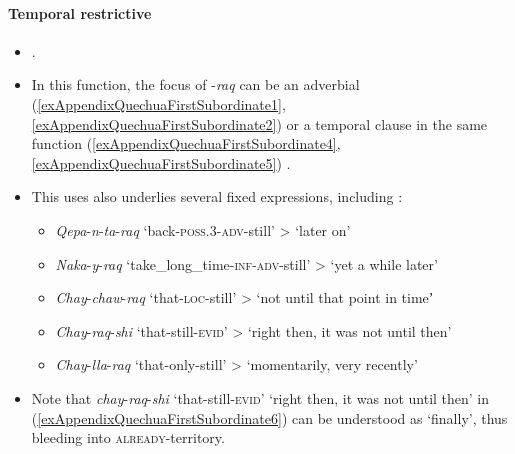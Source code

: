 \paragraph{Temporal restrictive}
\label{AppendixQuechuaFirstSubordinate}
\begin{itemize}
	\item \textcite[386–387]{Weber1989}.
	\item In this function, the focus of \mbox{-\textit{raq}} can be an adverbial (\ref{exAppendixQuechuaFirstSubordinate1}, \ref{exAppendixQuechuaFirstSubordinate2}) or a temporal clause in the same function (\ref{exAppendixQuechuaFirstSubordinate4}, \ref{exAppendixQuechuaFirstSubordinate5}) . 
	\item This uses also underlies several fixed expressions, including \parencite[65–66, 390]{Weber1989}:
	\begin{itemize}

		\item \textit{Qepa}-\textit{n}-\textit{ta}-\textit{raq} \lq back-\textsc{poss}.3-\textsc{adv}-still' > \lq later on'
		\item \textit{Naka}-\textit{y}-\textit{raq} \lq take\_long\_time-\textsc{inf}-\textsc{adv}-still' > \lq yet a while later'
		\item \textit{Chay}-\textit{chaw}-\textit{raq} \lq that-\textsc{loc}-still' > \lq not until that point in timeʼ
		\item \textit{Chay}-\textit{raq}-\textit{shi} \lq that-still-\textsc{evid}' > \lq right then, it was not until then'
		\item \textit{Chay}-\textit{lla}-\textit{raq} \lq that-only-still' > \lq momentarily, very recently'
	\end{itemize}
	\item Note that \textit{chay}-\textit{raq}-\textit{shi} \lq that-still-\textsc{evid}'  \lq right then, it was not until then' in (\ref{exAppendixQuechuaFirstSubordinate6}) can be understood as \lq finally', thus bleeding into \textsc{already}-territory.
\end{itemize}


